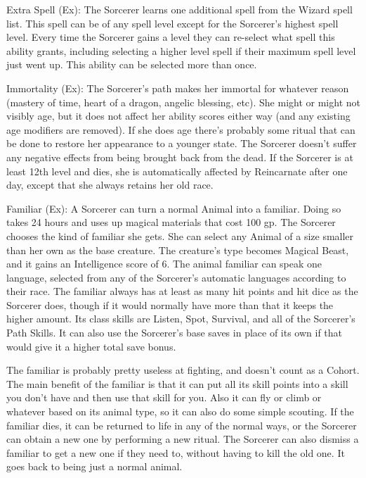 \begin{description*}
\item[Extra Spell (Ex):] The Sorcerer learns one additional spell from the Wizard spell list. This spell can be of any spell level except for the Sorcerer's highest spell level. Every time the Sorcerer gains a level they can re-select what spell this ability grants, including selecting a higher level spell if their maximum spell level just went up. This ability can be selected more than once.

\item[Immortality (Ex):] The Sorcerer's path makes her immortal for whatever reason (mastery of time, heart of a dragon, angelic blessing, etc). She might or might not visibly age, but it does not affect her ability scores either way (and any existing age modifiers are removed). If she does age there's probably some ritual that can be done to restore her appearance to a younger state. The Sorcerer doesn't suffer any negative effects from being brought back from the dead. If the Sorcerer is at least 12th level and dies, she is automatically affected by Reincarnate after one day, except that she always retains her old race.

\item[Familiar (Ex):] A Sorcerer can turn a normal Animal into a familiar. Doing so takes 24 hours and uses up magical materials that cost 100 gp. The Sorcerer chooses the kind of familiar she gets. She can select any Animal of a size smaller than her own as the base creature. The creature's type becomes Magical Beast, and it gains an Intelligence score of 6. The animal familiar can speak one language, selected from any of the Sorcerer's automatic languages according to their race. The familiar always has at least as many hit points and hit dice as the Sorcerer does, though if it would normally have more than that it keeps the higher amount. Its class skills are Listen, Spot, Survival, and all of the Sorcerer's Path Skills. It can also use the Sorcerer's base saves in place of its own if that would give it a higher total save bonus.

The familiar is probably pretty useless at fighting, and doesn't count as a Cohort. The main benefit of the familiar is that it can put all its skill points into a skill you don't have and then use that skill for you. Also it can fly or climb or whatever based on its animal type, so it can also do some simple scouting. If the familiar dies, it can be returned to life in any of the normal ways, or the Sorcerer can obtain a new one by performing a new ritual. The Sorcerer can also dismiss a familiar to get a new one if they need to, without having to kill the old one. It goes back to being just a normal animal.


\end{description*}
